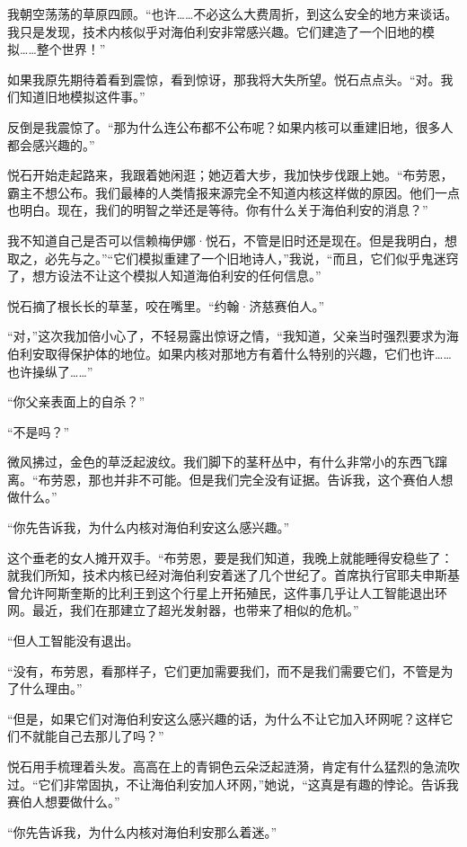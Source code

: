 \documentclass[AutoFakeBold=true]{book}
\begin{document}
我朝空荡荡的草原四顾。``也许……不必这么大费周折，到这么安全的地方来谈话。我只是发现，技术内核似乎对海伯利安非常感兴趣。它们建造了一个旧地的模拟……整个世界！''

如果我原先期待着看到震惊，看到惊讶，那我将大失所望。悦石点点头。``对。我们知道旧地模拟这件事。''

反倒是我震惊了。``那为什么连公布都不公布呢？如果内核可以重建旧地，很多人都会感兴趣的。''

悦石开始走起路来，我跟着她闲逛；她迈着大步，我加快步伐跟上她。``布劳恩，霸主不想公布。我们最棒的人类情报来源完全不知道内核这样做的原因。他们一点也明白。现在，我们的明智之举还是等待。你有什么关于海伯利安的消息？''

我不知道自己是否可以信赖梅伊娜·悦石，不管是旧时还是现在。但是我明白，想取之，必先与之。''``它们模拟重建了一个旧地诗人，''我说，``而且，它们似乎鬼迷窍了，想方设法不让这个模拟人知道海伯利安的任何信息。''

悦石摘了根长长的草茎，咬在嘴里。``约翰·济慈赛伯人。''

``对，''这次我加倍小心了，不轻易露出惊讶之情，``我知道，父亲当时强烈要求为海伯利安取得保护体的地位。如果内核对那地方有着什么特别的兴趣，它们也许……也许操纵了……''

``你父亲表面上的自杀？''

``不是吗？''

微风拂过，金色的草泛起波纹。我们脚下的茎秆丛中，有什么非常小的东西飞蹿离。``布劳恩，那也并非不可能。但是我们完全没有证据。告诉我，这个赛伯人想做什么。''

``你先告诉我，为什么内核对海伯利安这么感兴趣。''

这个垂老的女人摊开双手。``布劳恩，要是我们知道，我晚上就能睡得安稳些了：就我们所知，技术内核已经对海伯利安着迷了几个世纪了。首席执行官耶夫申斯基曾允许阿斯奎斯的比利王到这个行星上开拓殖民，这件事几乎让人工智能退出环网。最近，我们在那建立了超光发射器，也带来了相似的危机。''

``但人工智能没有退出。

``没有，布劳恩，看那样子，它们更加需要我们，而不是我们需要它们，不管是为了什么理由。''

``但是，如果它们对海伯利安这么感兴趣的话，为什么不让它加入环网呢？这样它们不就能自己去那儿了吗？''

悦石用手梳理着头发。高高在上的青铜色云朵泛起涟漪，肯定有什么猛烈的急流吹过。``它们非常固执，不让海伯利安加人环网，''她说，``这真是有趣的悖论。告诉我赛伯人想要做什么。''

``你先告诉我，为什么内核对海伯利安那么着迷。''
\end{document}
